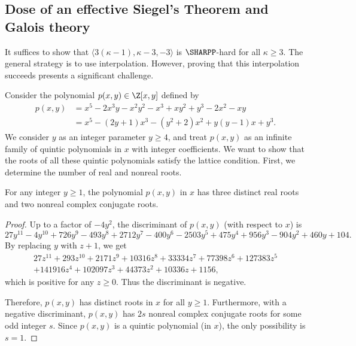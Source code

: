 \documentclass[11pt]{article}
\begin{document}
\subsection{Dose of an effective Siegel's Theorem and Galois theory} \label{subsec:ternary:<(k-1),k-3,-3>}

It suffices to show that $\langle 3 (\kappa - 1), \kappa - 3, -3 \rangle$ is $\SHARPP$-hard for all $\kappa \ge 3$.
The general strategy is to use interpolation.
However, proving that this interpolation succeeds presents a significant challenge.

Consider the polynomial $p(x,y) \in \Z[x,y]$ defined by
\begin{align*}
 p(x,y)
 &= x^5 - 2 x^3 y - x^2 y^2 - x^3 +  x y^2 + y^3  - 2 x^2 - x y\\
 &= x^5 - (2 y + 1) x^3 - (y^2 + 2) x^2 + y (y-1) x + y^3.
\end{align*}
We consider $y$ as an integer parameter $y \ge 4$,
and treat $p(x,y)$ as an infinite family of quintic polynomials in $x$ with integer coefficients.
We want to show that the roots of all these quintic polynomials satisfy the lattice condition.
First, we determine the number of real and nonreal roots.

\begin{lemma} \label{lem:ternary:3r2c_roots}
 For any integer $y \ge 1$,
 the polynomial $p(x,y)$ in $x$ has three distinct real roots and two nonreal complex conjugate roots.
\end{lemma}

\begin{proof}
 Up to a factor of $-4 y^2$,
 the discriminant of $p(x,y)$ (with respect to $x$) is
 \[
  27 y^{11} - 4 y^{10} + 726 y^9 - 493 y^8 + 2712 y^7 - 400 y^6 - 2503 y^5 + 475 y^4 + 956 y^3 - 904 y^2 + 460 y + 104.
 \]
 By replacing $y$ with $z + 1$,
 we get
 \begin{gather*}
    27 z^{11} + 293 z^{10} + 2171 z^9 + 10316 z^8 + 33334 z^7 + 77398 z^6 + 127383 z^5 \\
  + 141916 z^4 + 102097 z^3 + 44373 z^2 + 10336 z + 1156,
 \end{gather*}
 which is positive for any $z \ge 0$.
 Thus the discriminant is negative.
 
 Therefore, $p(x,y)$ has distinct roots in $x$ for all $y \ge 1$.
 Furthermore, with a negative discriminant,
 $p(x,y)$ has $2 s$ nonreal complex conjugate roots for some odd integer $s$.
 Since $p(x,y)$ is a quintic polynomial (in $x$),
 the only possibility is $s = 1$.
\end{proof}
\end{document}
